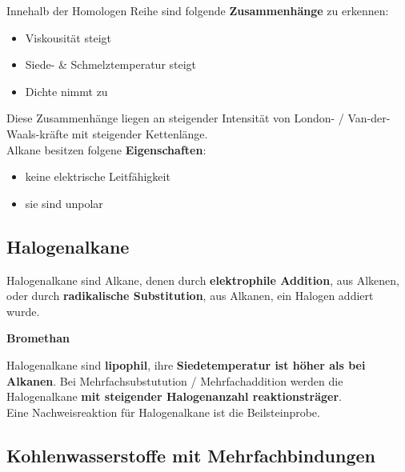 \documentclass[a4paper]{report}
\begin{document}
Innehalb der Homologen Reihe sind folgende \textbf{Zusammenhänge} zu erkennen:\\
\begin{itemize}
    \item {Viskousität steigt}
    \item {Siede- \& Schmelztemperatur steigt}
    \item {Dichte nimmt zu} \\
\end{itemize}
Diese Zusammenhänge liegen an steigender Intensität von London- / Van-der-Waals-kräfte mit steigender Kettenlänge.\\[0,5cm]

Alkane besitzen folgene \textbf{Eigenschaften}:\\
\begin{itemize}
    \item{keine elektrische Leitfähigkeit}
    \item {sie sind unpolar}\\[1cm]
\end{itemize}


\subsection{Halogenalkane}

Halogenalkane sind Alkane, denen durch \textbf{elektrophile Addition}, aus Alkenen, oder durch
\textbf{radikalische Substitution}, aus Alkanen, ein Halogen addiert wurde. \\

\begin{center}
     \hspace{1cm} \textbf{Bromethan}\\[0,5cm]
\end{center}

Halogenalkane sind \textbf{lipophil}, ihre \textbf{Siedetemperatur ist höher als bei Alkanen}.
Bei Mehrfachsubstutution / Mehrfachaddition werden die Halogenalkane \textbf{mit steigender Halogenanzahl reaktionsträger}.\\

Eine Nachweisreaktion für Halogenalkane ist die Beilsteinprobe.



\subsection{Kohlenwasserstoffe mit Mehrfachbindungen}
\end{document}
